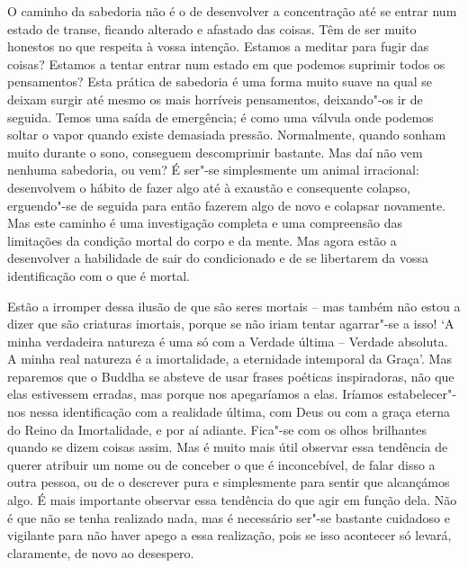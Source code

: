 O caminho da sabedoria não é o de desenvolver a concentração até se
entrar num estado de transe, ficando alterado e afastado das coisas. Têm
de ser muito honestos no que respeita à vossa intenção. Estamos a
meditar para fugir das coisas? Estamos a tentar entrar num estado em que
podemos suprimir todos os pensamentos? Esta prática de sabedoria é uma
forma muito suave na qual se deixam surgir até mesmo os mais horríveis
pensamentos, deixando"-os ir de seguida. Temos uma saída de emergência; é
como uma válvula onde podemos soltar o vapor quando existe demasiada
pressão. Normalmente, quando sonham muito durante o sono, conseguem
descomprimir bastante. Mas daí não vem nenhuma sabedoria, ou vem? É
ser"-se simplesmente um animal irracional: desenvolvem o hábito de fazer
algo até à exaustão e consequente colapso, erguendo"-se de seguida para
então fazerem algo de novo e colapsar novamente. Mas este caminho é uma
investigação completa e uma compreensão das limitações da condição
mortal do corpo e da mente. Mas agora estão a desenvolver a habilidade
de sair do condicionado e de se libertarem da vossa identificação com o
que é mortal.

Estão a irromper dessa ilusão de que são seres mortais -- mas também não
estou a dizer que são criaturas imortais, porque se não iriam tentar
agarrar"-se a isso! `A minha verdadeira natureza é uma só com a Verdade
última -- Verdade absoluta. A minha real natureza é a imortalidade, a 
eternidade intemporal da Graça'. Mas reparemos que o Buddha se absteve de 
usar frases poéticas inspiradoras, não que elas estivessem erradas, mas
porque nos apegaríamos a elas. Iríamos estabelecer"-nos nessa
identificação com a realidade última, com Deus ou com a graça eterna do
Reino da Imortalidade, e por aí adiante. Fica"-se com os olhos brilhantes
quando se dizem coisas assim. Mas é muito mais útil observar essa
tendência de querer atribuir um nome ou de conceber o que é
inconcebível, de falar disso a outra pessoa, ou de o descrever pura e
simplesmente para sentir que alcançámos algo. É mais importante observar
essa tendência do que agir em função dela. Não é que não se tenha
realizado nada, mas é necessário ser"-se bastante cuidadoso e vigilante
para não haver apego a essa realização, pois se isso acontecer só
levará, claramente, de novo ao desespero.

